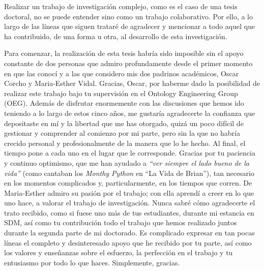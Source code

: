 
\begin{acknowledgementslong} 

Realizar un trabajo de investigación complejo, como es el caso de una tesis doctoral, no se puede entender sino como un trabajo colaborativo. Por ello,  a lo largo de las líneas que siguen trataré de agradecer y mencionar a todo aquel que ha contribuido, de una forma u otra, al desarrollo de esta investigación.

Para comenzar, la realización de esta tesis habría sido imposible sin el apoyo constante de dos personas que admiro profundamente desde el primer momento en que las conocí y a las que considero mis dos padrinos académicos, Oscar Corcho y Maria-Esther Vidal.  Gracias, Oscar, por haberme dado la posibilidad de realizar este trabajo bajo tu supervisión en el Ontology Engineering Group (OEG). Además de disfrutar enormemente con las discusiones que hemos ido teniendo a lo largo de estos cinco años, me gustaría agradecerte la confianza que depositaste en mí y la libertad que me has otorgado, quizá un poco difícil de gestionar y comprender al comienzo por mi parte, pero sin la que  no habría crecido personal y profesionalmente de la manera que lo he hecho. Al final, el tiempo pone a cada uno en el lugar que le corresponde. Gracias por tu paciencia y continuo optimismo, que me han ayudado a \textit{``ver siempre el lado bueno de la vida''} (como cantaban los \textit{Monthy Python} en ``La Vida de Brian''), tan necesario en los momentos complicados y, particularmente, en los tiempos que corren. De Maria-Esther admiro su pasión por el trabajo; con ella aprendí a creer en lo que uno hace,  a valorar el trabajo de investigación. Nunca sabré cómo agradecerte el trato recibido, como si fuese uno más de tus estudiantes, durante mi estancia en SDM, así como tu contribución todo el trabajo que hemos realizado juntos durante la segunda parte de mi doctorado. Es complicado expresar en tan pocas líneas el completo y desinteresado apoyo que he recibido por tu parte, así como los valores y enseñanzas sobre el esfuerzo, la perfección en el trabajo y tu entusiasmo por todo lo que haces. Simplemente, gracias. 


\end{acknowledgementslong}
